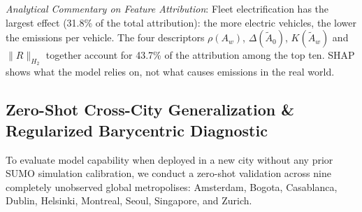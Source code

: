 \documentclass[journal]{IEEEtran}
\begin{document}
\begin{table}[htbp]
\caption{Top 10 Most Influential Features Ranked by Mean Absolute TreeSHAP Value on Normalized Target $y$}
\label{tab:shap_importance}
\centering
{}
\end{table}

\textit{Analytical Commentary on Feature Attribution}:
Fleet electrification has the largest effect (31.8\% of the total attribution): the more electric vehicles, the lower the emissions per vehicle. The four descriptors $\rho(A_w)$, $\Delta(\tilde{A}_0)$, $K(\tilde{A}_w)$ and $\|R\|_{H_2}$ together account for 43.7\% of the attribution among the top ten. SHAP shows what the model relies on, not what causes emissions in the real world.

\subsection{Zero-Shot Cross-City Generalization \& Regularized Barycentric Diagnostic}
To evaluate model capability when deployed in a new city without any prior SUMO simulation calibration, we conduct a zero-shot validation across nine completely unobserved global metropolises: Amsterdam, Bogota, Casablanca, Dublin, Helsinki, Montreal, Seoul, Singapore, and Zurich.
\end{document}
